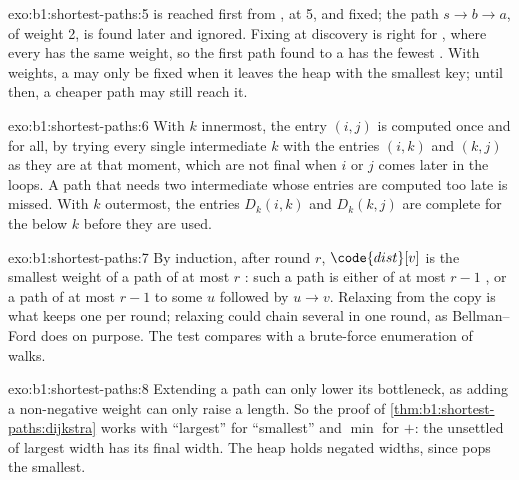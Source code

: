 \begin{solution}{exo:b1:shortest-paths:5}
 is reached first from , at 5, and fixed; the path $s \to b \to a$, of weight 2, is found later and
ignored. Fixing at discovery is right for , where every  has the same weight, so the first
path found to a  has the fewest . With weights, a  may only be fixed when it leaves the heap with the
smallest key; until then, a cheaper path may still reach it.
\end{solution}

\begin{solution}{exo:b1:shortest-paths:6}
With $k$ innermost, the entry $(i, j)$ is computed once and for all, by trying every single intermediate  $k$ with
the entries $(i, k)$ and $(k, j)$ as they are at that moment, which are not final when $i$ or $j$ comes later in the
loops. A path that needs two intermediate  whose entries are computed too late is missed. With $k$ outermost,
the entries $D_k(i, k)$ and $D_k(k, j)$ are complete for the  below $k$ before they are used.
\end{solution}

\begin{solution}{exo:b1:shortest-paths:7}
By induction, after round $r$, $\code{dist}[v]$ is the smallest weight of a path of at most $r$ : such a path is
either of at most $r - 1$ , or a path of at most $r - 1$  to some $u$ followed by $u \to v$. Relaxing from the
copy  is what keeps one  per round; relaxing  could chain several  in one round, as
Bellman--Ford does on purpose. The test compares with a brute-force enumeration of walks.
\end{solution}

\begin{solution}{exo:b1:shortest-paths:8}
Extending a path can only lower its bottleneck, as adding a non-negative weight can only raise a length. So the proof
of \cref{thm:b1:shortest-paths:dijkstra} works with ``largest'' for ``smallest'' and $\min$ for $+$: the unsettled 
of largest width has its final width. The heap holds negated widths, since  pops the smallest.
\end{solution}

